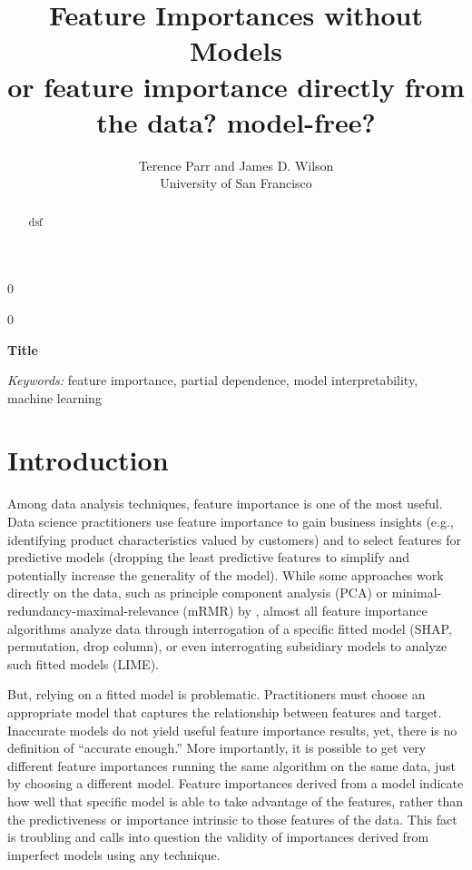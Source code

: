 \documentclass[12pt]{article}
\newcommand{\blind}{0}
\begin{document}
\def\spacingset#1{\renewcommand{\baselinestretch}%
{#1}\small\normalsize} \spacingset{1}



\blind
{
  \title{\bf Feature Importances without Models\\
  {\small or feature importance directly from the data? model-free?}}

  \author{Terence Parr and James D. Wilson\\
      University of San Francisco\\
}
  \maketitle
} \fi

\blind
{
  \bigskip
  \bigskip
  \bigskip
  \begin{center}
    {\LARGE\bf Title}
\end{center}
  \medskip
} \fi

\bigskip
\begin{abstract}
dsf
\end{abstract}

\noindent%
{\it Keywords:} feature importance, partial dependence, model interpretability, machine learning

\section{Introduction}
\label{sec:intro}

Among data analysis techniques, feature importance is one of the most  useful. Data science practitioners use feature importance to gain business insights (e.g., identifying product characteristics valued by customers) and to select features for predictive models (dropping the least predictive features to simplify and potentially increase the generality of the model). While some approaches work directly on the data, such as principle component analysis (PCA) or minimal-redundancy-maximal-relevance (mRMR) by \cite{mRMR}, almost all feature importance algorithms analyze data through interrogation of a specific  fitted model (SHAP, permutation, drop column), or even interrogating subsidiary models to analyze such fitted models (LIME).

But, relying on a fitted model is problematic. Practitioners must choose an appropriate model that captures the relationship between features and target. Inaccurate models do not yield useful feature importance results, yet, there is no definition of ``accurate enough.'' More importantly, it is possible to get very different feature importances running the same algorithm on the same data, just by choosing a different model. Feature importances derived from a model indicate how well that specific model is able to take advantage of the features, rather than the predictiveness or importance intrinsic to those features of the data.  This fact is troubling and calls into question the validity of importances derived from imperfect models using any technique.  
\end{document}
